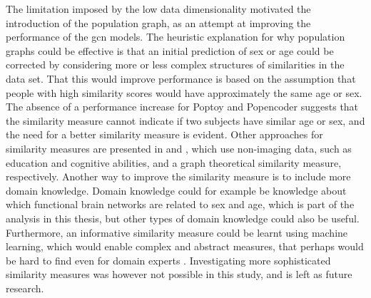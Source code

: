 The limitation imposed by the low data dimensionality motivated the introduction of the population graph, as an attempt at improving the performance of the \acrshort{gcn} models. The heuristic explanation for why population graphs could be effective is that an initial prediction of sex or age could be corrected by considering more or less complex structures of similarities in the data set. That this would improve performance is based on the assumption that people with high similarity scores would have approximately the same age or sex. The absence of a performance increase for Poptoy and Popencoder suggests that the similarity measure cannot indicate if two subjects have similar age or sex, and the need for a better similarity measure is evident. Other approaches for similarity measures are presented in \cite{stankeviciute} and \cite{higcn}, which use non-imaging data, such as education and cognitive abilities, and a graph theoretical similarity measure, respectively. Another way to improve the similarity measure is to include more domain knowledge. Domain knowledge could for example be knowledge about which functional brain networks are related to sex and age, which is part of the analysis in this thesis, but other types of domain knowledge could also be useful. Furthermore, an informative similarity measure could be learnt using machine learning, which would enable complex and abstract measures, that perhaps would be hard to find even for domain experts \cite{sim_meas_constr}. Investigating more sophisticated similarity measures was however not possible in this study, and is left as future research. 




